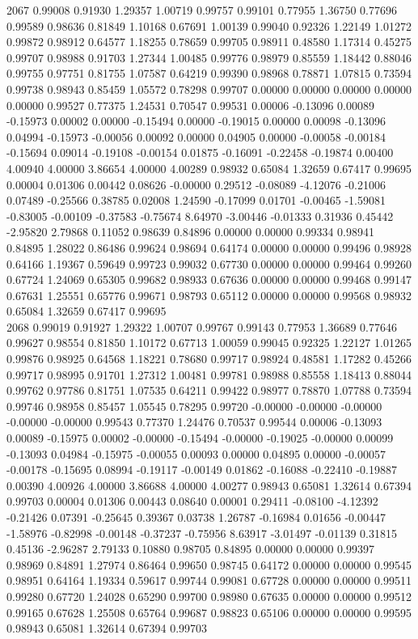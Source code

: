 {2067 0.99008 0.91930 1.29357 1.00719 0.99757 0.99101 0.77955 1.36750 0.77696 0.99589 0.98636 0.81849 1.10168 0.67691 1.00139 0.99040 0.92326 1.22149 1.01272 0.99872 0.98912 0.64577 1.18255 0.78659 0.99705 0.98911 0.48580 1.17314 0.45275 0.99707 0.98988 0.91703 1.27344 1.00485 0.99776 0.98979 0.85559 1.18442 0.88046 0.99755 0.97751 0.81755 1.07587 0.64219 0.99390 0.98968 0.78871 1.07815 0.73594 0.99738 0.98943 0.85459 1.05572 0.78298 0.99707 0.00000 0.00000 0.00000 0.00000 0.00000 0.99527 0.77375 1.24531 0.70547 0.99531 0.00006 -0.13096 0.00089 -0.15973 0.00002 0.00000 -0.15494 0.00000 -0.19015 0.00000 0.00098 -0.13096 0.04994 -0.15973 -0.00056 0.00092 0.00000 0.04905 0.00000 -0.00058 -0.00184 -0.15694 0.09014 -0.19108 -0.00154 0.01875 -0.16091 -0.22458 -0.19874 0.00400 4.00940 4.00000 3.86654 4.00000 4.00289 0.98932 0.65084 1.32659 0.67417 0.99695 0.00004 0.01306 0.00442 0.08626 -0.00000 0.29512 -0.08089 -4.12076 -0.21006 0.07489 -0.25566 0.38785 0.02008 1.24590 -0.17099 0.01701 -0.00465 -1.59081 -0.83005 -0.00109 -0.37583 -0.75674 8.64970 -3.00446 -0.01333 0.31936 0.45442 -2.95820 2.79868 0.11052 0.98639 0.84896 0.00000 0.00000 0.99334 0.98941 0.84895 1.28022 0.86486 0.99624 0.98694 0.64174 0.00000 0.00000 0.99496 0.98928 0.64166 1.19367 0.59649 0.99723 0.99032 0.67730 0.00000 0.00000 0.99464 0.99260 0.67724 1.24069 0.65305 0.99682 0.98933 0.67636 0.00000 0.00000 0.99468 0.99147 0.67631 1.25551 0.65776 0.99671 0.98793 0.65112 0.00000 0.00000 0.99568 0.98932 0.65084 1.32659 0.67417 0.99695 \\
2068 0.99019 0.91927 1.29322 1.00707 0.99767 0.99143 0.77953 1.36689 0.77646 0.99627 0.98554 0.81850 1.10172 0.67713 1.00059 0.99045 0.92325 1.22127 1.01265 0.99876 0.98925 0.64568 1.18221 0.78680 0.99717 0.98924 0.48581 1.17282 0.45266 0.99717 0.98995 0.91701 1.27312 1.00481 0.99781 0.98988 0.85558 1.18413 0.88044 0.99762 0.97786 0.81751 1.07535 0.64211 0.99422 0.98977 0.78870 1.07788 0.73594 0.99746 0.98958 0.85457 1.05545 0.78295 0.99720 -0.00000 -0.00000 -0.00000 -0.00000 -0.00000 0.99543 0.77370 1.24476 0.70537 0.99544 0.00006 -0.13093 0.00089 -0.15975 0.00002 -0.00000 -0.15494 -0.00000 -0.19025 -0.00000 0.00099 -0.13093 0.04984 -0.15975 -0.00055 0.00093 0.00000 0.04895 0.00000 -0.00057 -0.00178 -0.15695 0.08994 -0.19117 -0.00149 0.01862 -0.16088 -0.22410 -0.19887 0.00390 4.00926 4.00000 3.86688 4.00000 4.00277 0.98943 0.65081 1.32614 0.67394 0.99703 0.00004 0.01306 0.00443 0.08640 0.00001 0.29411 -0.08100 -4.12392 -0.21426 0.07391 -0.25645 0.39367 0.03738 1.26787 -0.16984 0.01656 -0.00447 -1.58976 -0.82998 -0.00148 -0.37237 -0.75956 8.63917 -3.01497 -0.01139 0.31815 0.45136 -2.96287 2.79133 0.10880 0.98705 0.84895 0.00000 0.00000 0.99397 0.98969 0.84891 1.27974 0.86464 0.99650 0.98745 0.64172 0.00000 0.00000 0.99545 0.98951 0.64164 1.19334 0.59617 0.99744 0.99081 0.67728 0.00000 0.00000 0.99511 0.99280 0.67720 1.24028 0.65290 0.99700 0.98980 0.67635 0.00000 0.00000 0.99512 0.99165 0.67628 1.25508 0.65764 0.99687 0.98823 0.65106 0.00000 0.00000 0.99595 0.98943 0.65081 1.32614 0.67394 0.99703 \\
}
